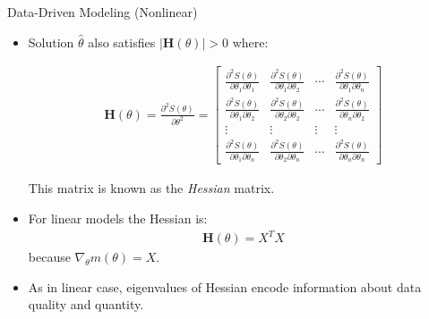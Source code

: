 \documentclass[9pt]{beamer}
\begin{document}
%
\begin{frame}{Data-Driven Modeling (Nonlinear)}

\begin{itemize}
\setlength{\itemsep}{10pt}
\item Solution $\hat{\theta}$ also satisfies $|\mathbf{H}({\theta})|>0$ where:
\begin{footnotesize}
\begin{align*}
\mathbf{H}(\theta)=\frac{\partial^2 S(\theta)}{\partial \theta^2}=
\left[\begin{array}{ccccccccc}
\frac{\partial^2 S(\theta)}{\partial \theta_1\partial \theta_1}&\frac{\partial^2 S(\theta)}{\partial \theta_1\partial \theta_2}&\cdots& \frac{\partial^2 S(\theta)}{\partial \theta_1\partial \theta_n}\\
\frac{\partial^2 S(\theta)}{\partial \theta_1\partial \theta_2}&\frac{\partial^2 S(\theta)}{\partial \theta_2\partial \theta_2}&\cdots&\frac{\partial^2 S(\theta)}{\partial \theta_n\partial \theta_2}\\
\vdots & \vdots &\vdots &\vdots\\
\frac{\partial^2 S(\theta)}{\partial \theta_1\partial \theta_n}&\frac{\partial^2 S(\theta)}{\partial \theta_2\partial \theta_n}&\cdots& \frac{\partial^2 S(\theta)}{\partial \theta_n\partial \theta_n}
\end{array}\right]
\end{align*}
\end{footnotesize}
This matrix is known as the {\em Hessian} matrix. 
\item For linear models the Hessian is:
\begin{align*}
\mathbf{H}(\theta)=X^TX
\end{align*}
because  $\nabla_\theta m(\theta)=X$.  
\item As in linear case, eigenvalues of Hessian encode information about data quality and quantity. 
\end{itemize}
\end{frame}
\end{document}
